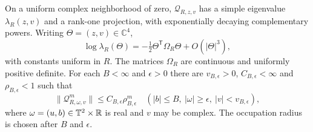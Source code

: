 \begin{proposition}
\label{prop:v37-joint-small-frequency}
On a uniform complex neighborhood of zero, $\mathcal Q_{R,z,v}$ has
a simple eigenvalue $\lambda_R(z,v)$ and a rank-one projection,
with exponentially decaying complementary powers. Writing
$\Theta=(z,v)\in\mathbb C^4$,
\begin{equation}\label{eq:v37-joint-expansion}
 \log\lambda_R(\Theta)=-\tfrac12\Theta^{\mathsf T}\Omega_R\Theta
                         +O(|\Theta|^3),
\end{equation}
with constants uniform in $R$. The matrices $\Omega_R$ are continuous
and uniformly positive definite. For each $B<\infty$ and $\epsilon>0$
there are $v_{B,\epsilon}>0$, $C_{B,\epsilon}<\infty$ and
$\rho_{B,\epsilon}<1$ such that
\begin{equation}\label{eq:v37-compact-small-occupation}
 \|\mathcal Q_{R,\omega,v}^m\|
       \le C_{B,\epsilon}\rho_{B,\epsilon}^m
 \quad (|b|\le B,\ |\omega|\ge\epsilon,\ |v|<v_{B,\epsilon}),
\end{equation}
where $\omega=(u,b)\in\mathbb T^2\times\mathbb R$ is real and $v$ may be complex.
The occupation radius is chosen after $B$ and $\epsilon$.
\end{proposition}
